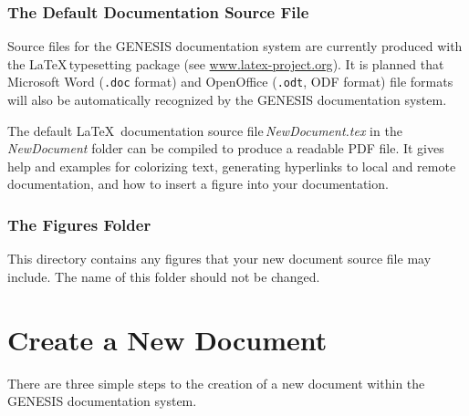 \documentclass[12pt]{article}
\begin{document}
\subsubsection*{The Default Documentation Source File}

Source files for the GENESIS documentation system are currently produced with the \LaTeX\,typesetting package (see \href{http://www.latex-project.org/}{www.latex-project.org}). It is planned that Microsoft Word ({\tt .doc} format) and OpenOffice ({\tt .odt}, ODF format) file formats will also be automatically recognized by the GENESIS documentation system.

The default \LaTeX\, documentation source file\,{\it NewDocument.tex} in the {\it NewDocument} folder can be compiled to produce a readable PDF file. It gives help and examples for colorizing text, generating hyperlinks to local and remote documentation, and how to insert a figure into your documentation.

\subsubsection*{The Figures Folder}

This directory contains any figures that your new document source file may include. The name of this folder should not be changed.
 
\section*{Create a New Document}

There are three simple steps to the creation of a new document within the GENESIS documentation system.
\end{document}
